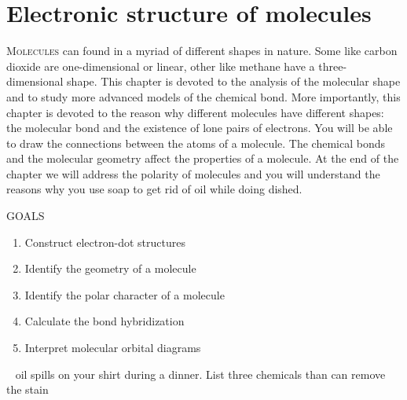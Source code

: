 \documentclass[main.tex]{subfiles}
\begin{document}
\linenumbers


\chapter[Electronic structure of molecules ]{Electronic structure of molecules}
\label{ch:bond}


   
    \begin{marginfigure}
\label{fig:marginfig}
\end{marginfigure}
   
   
\lettrine[lines=4]{\color{black!45}M}{olecules} can found in a myriad of different shapes in nature. Some like carbon dioxide are one-dimensional or linear, other like methane have a three-dimensional shape. This chapter is devoted to the analysis of the molecular shape and to study more advanced models of the chemical bond. More importantly, this chapter is devoted to the reason why different molecules have different shapes: the molecular bond and the existence of lone pairs of electrons. You will be able to draw the connections between the atoms of a molecule.  The chemical bonds and the molecular geometry affect the properties of a molecule. At the end of the chapter we will address the polarity of molecules and you will understand the reasons why you use soap to get rid of oil while doing dished.

\begin{marginfigure}%
\begin{mytcbox}{GOALS}
\begin{enumerate}[label=\protect\circled{\color{white}\arabic*}]
\item Construct electron-dot structures
\item Identify the geometry of a molecule
\item Identify the polar character of a molecule
\item Calculate the bond hybridization 
 \item Interpret molecular orbital diagrams
\end{enumerate}
\end{mytcbox}
\vspace{1cm}

\begin{tcolorbox}[enhanced,colback=red!5!white,colframe=black!50!red,boxrule=1pt,
  arc=0pt,outer arc=0pt,drop heavy lifted shadow]
\faGears\ 
 oil spills on your shirt during a dinner. List three chemicals than can remove the stain  \end{tcolorbox}


\end{marginfigure}%
\end{document}

